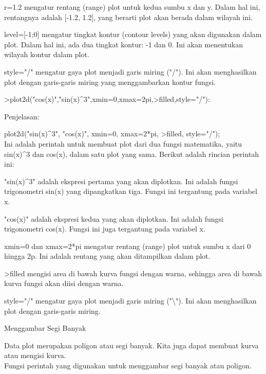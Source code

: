 \documentclass[a4paper,10pt]{article}
\begin{document}
\begin{eulernotebook}
\begin{eulercomment}
\begin{eulercomment}
\begin{eulercomment}
\begin{eulercomment}
\begin{eulercomment}
\begin{eulercomment}
\begin{eulercomment}
\begin{eulercomment}
\begin{eulercomment}
\begin{eulercomment}
\begin{eulercomment}
\begin{eulercomment}
\begin{eulercomment}
r=1.2 mengatur rentang (range) plot untuk kedua sumbu x dan y. Dalam
hal ini, rentangnya adalah [-1.2, 1.2], yang berarti plot akan berada
dalam wilayah ini.

level=[-1;0] mengatur tingkat kontur (contour levels) yang akan
digunakan dalam plot. Dalam hal ini, ada dua tingkat kontur: -1 dan 0.
Ini akan menentukan wilayah kontur dalam plot.

style="/" mengatur gaya plot menjadi garis miring ("/"). Ini akan
menghasilkan plot dengan garis-garis miring yang menggambarkan kontur
fungsi.

\end{eulercomment}
\begin{eulerprompt}
>plot2d("cos(x)","sin(x)^3",xmin=0,xmax=2pi,>filled,style="/"):
\end{eulerprompt}
\begin{eulercomment}
Penjelasan:

plot2d("sin(x)\textasciicircum{}3", "cos(x)", xmin=0, xmax=2*pi, \textgreater{}filled, style="/");\\
Ini adalah perintah untuk membuat plot dari dua fungsi matematika,
yaitu sin(x)\textasciicircum{}3 dan cos(x), dalam satu plot yang sama. Berikut adalah
rincian perintah ini:

"sin(x)\textasciicircum{}3" adalah ekspresi pertama yang akan diplotkan. Ini adalah
fungsi trigonometri sin(x) yang dipangkatkan tiga. Fungsi ini
tergantung pada variabel x.

"cos(x)" adalah ekspresi kedua yang akan diplotkan. Ini adalah fungsi
trigonometri cos(x). Fungsi ini juga tergantung pada variabel x.

xmin=0 dan xmax=2*pi mengatur rentang (range) plot untuk sumbu x dari
0 hingga 2p. Ini adalah rentang yang akan ditampilkan dalam plot.

\textgreater{}filled mengisi area di bawah kurva fungsi dengan warna, sehingga area
di bawah kurva fungsi akan diisi dengan warna.

style="/" mengatur gaya plot menjadi garis miring ("\textbackslash{}"). Ini akan
menghasilkan plot dengan garis-garis miring.
\end{eulercomment}
\begin{eulercomment}
Menggambar Segi Banyak 


Data plot merupakan poligon atau segi banyak. Kita juga dapat membuat
kurva atau mengisi kurva.\\
Fungsi perintah yang digunakan untuk menggambar segi banyak atau
poligon.


\end{eulercomment}
\end{eulercomment}
\end{eulercomment}
\end{eulercomment}
\end{eulercomment}
\end{eulercomment}
\end{eulercomment}
\end{eulercomment}
\end{eulercomment}
\end{eulercomment}
\end{eulercomment}
\end{eulercomment}
\end{eulercomment}
\end{eulernotebook}
\end{document}
